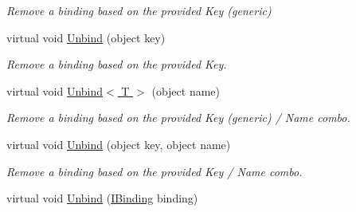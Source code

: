 \begin{DoxyCompactItemize}
\begin{DoxyCompactList}\small\item\em Remove a binding based on the provided Key (generic) \end{DoxyCompactList}\item 
\hypertarget{classstrange_1_1framework_1_1impl_1_1_binder_af87f713510c782354a6e736976d8cd4f}{virtual void \hyperlink{classstrange_1_1framework_1_1impl_1_1_binder_af87f713510c782354a6e736976d8cd4f}{Unbind} (object key)}\label{classstrange_1_1framework_1_1impl_1_1_binder_af87f713510c782354a6e736976d8cd4f}

\begin{DoxyCompactList}\small\item\em Remove a binding based on the provided Key. \end{DoxyCompactList}\item 
\hypertarget{classstrange_1_1framework_1_1impl_1_1_binder_a6aa6747c28bb0a1bdb529c5ccd0422c7}{virtual void \hyperlink{classstrange_1_1framework_1_1impl_1_1_binder_a6aa6747c28bb0a1bdb529c5ccd0422c7}{Unbind$<$ T $>$} (object name)}\label{classstrange_1_1framework_1_1impl_1_1_binder_a6aa6747c28bb0a1bdb529c5ccd0422c7}

\begin{DoxyCompactList}\small\item\em Remove a binding based on the provided Key (generic) / Name combo. \end{DoxyCompactList}\item 
\hypertarget{classstrange_1_1framework_1_1impl_1_1_binder_a821d230985f6c00af9289209d50ef237}{virtual void \hyperlink{classstrange_1_1framework_1_1impl_1_1_binder_a821d230985f6c00af9289209d50ef237}{Unbind} (object key, object name)}\label{classstrange_1_1framework_1_1impl_1_1_binder_a821d230985f6c00af9289209d50ef237}

\begin{DoxyCompactList}\small\item\em Remove a binding based on the provided Key / Name combo. \end{DoxyCompactList}\item 
\hypertarget{classstrange_1_1framework_1_1impl_1_1_binder_a43b2b8bba97c5d836d10fb0f03a3744f}{virtual void \hyperlink{classstrange_1_1framework_1_1impl_1_1_binder_a43b2b8bba97c5d836d10fb0f03a3744f}{Unbind} (\hyperlink{interfacestrange_1_1framework_1_1api_1_1_i_binding}{I\-Binding} binding)}\label{classstrange_1_1framework_1_1impl_1_1_binder_a43b2b8bba97c5d836d10fb0f03a3744f}


\end{DoxyCompactItemize}
